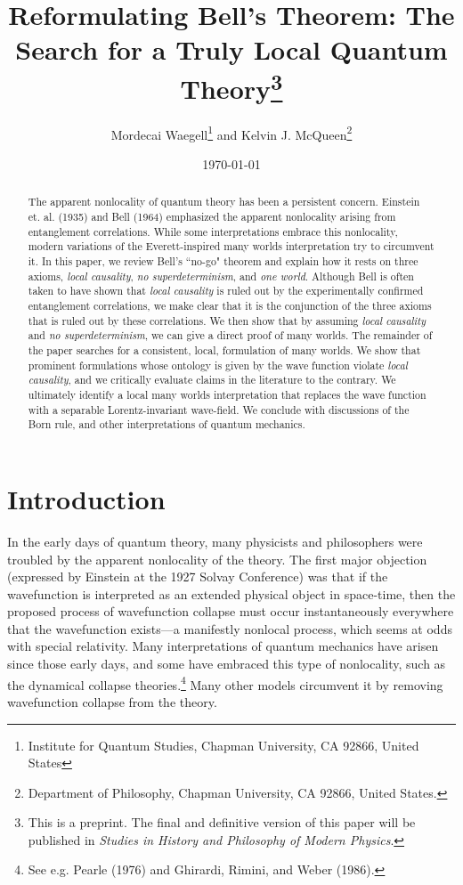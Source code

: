 \documentclass[a4paper]{article}
\title{Reformulating Bell's Theorem: The Search for a Truly Local Quantum Theory\thanks{This is a preprint. The final and definitive version of this paper will be published in \textit{Studies in History and Philosophy of Modern Physics}.}}
\author{Mordecai Waegell\thanks{Institute for Quantum Studies, Chapman University, CA 92866, United States} \space and Kelvin J. McQueen\thanks{Department of Philosophy, Chapman University, CA 92866, United States.}}
\date{\today}
\begin{document}
\maketitle

\begin{abstract}
The apparent nonlocality of quantum theory has been a persistent concern. Einstein et. al. (1935) and Bell (1964) emphasized the apparent nonlocality arising from entanglement correlations. While some interpretations embrace this nonlocality, modern variations of the Everett-inspired many worlds interpretation try to circumvent it. In this paper, we review Bell's ``no-go" theorem and explain how it rests on three axioms, \textit{local causality}, \textit{no superdeterminism}, and \textit{one world}. Although Bell is often taken to have shown that \textit{local causality} is ruled out by the experimentally confirmed entanglement correlations, we make clear that it is the conjunction of the three axioms that is ruled out by these correlations. We then show that by assuming \textit{local causality} and \textit{no superdeterminism}, we can give a direct proof of many worlds. The remainder of the paper searches for a consistent, local, formulation of many worlds. We show that prominent formulations whose ontology is given by the wave function violate \textit{local causality}, and we critically evaluate claims in the literature to the contrary.  We ultimately identify a local many worlds interpretation that replaces the wave function with a separable Lorentz-invariant wave-field.  We conclude with discussions of the Born rule, and other interpretations of quantum mechanics.


\end{abstract}

\tableofcontents

\section{Introduction}

In the early days of quantum theory, many physicists and philosophers were troubled by the apparent nonlocality of the theory.  The first major objection (expressed by Einstein at the 1927 Solvay Conference) was that if the wavefunction is interpreted as an extended physical object in space-time, then the proposed process of wavefunction collapse must occur instantaneously everywhere that the wavefunction exists---a manifestly nonlocal process, which seems at odds with special relativity. Many interpretations of quantum mechanics have arisen since those early days, and some have embraced this type of nonlocality, such as the dynamical collapse theories.\footnote{See e.g. Pearle (1976) and Ghirardi, Rimini, and Weber (1986).} Many other models circumvent it by removing wavefunction collapse from the theory. 
\end{document}
